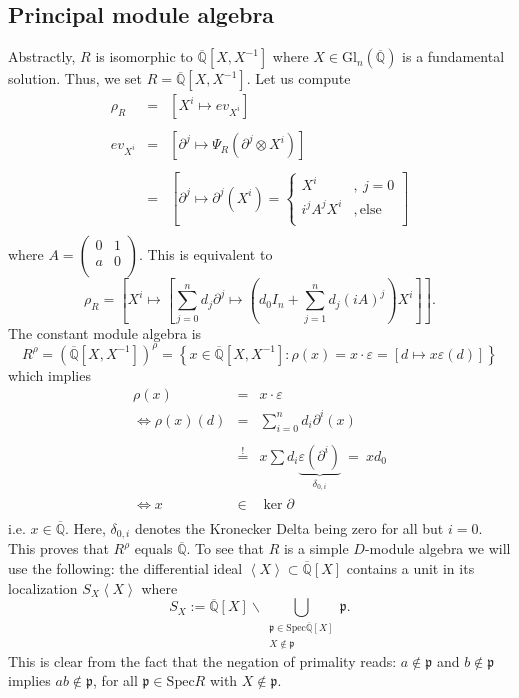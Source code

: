 \documentclass[10pt,a4paper]{article}
\newcommand{\eps}{\varepsilon}
\newcommand{\qz}{{\mathbb{Q}}}
\newcommand{\qzcl}{\overline{\qz}}
\newcommand{\bao}[1]{\begin{array}{#1}}
\newcommand{\ea}{\end{array}}
\begin{document}
\subsection{Principal module algebra}
Abstractly, $R$ is isomorphic to $\qzcl\left[X,X^{-1}\right]$ where $X \in \mathrm{Gl}_n(\qzcl)$ is a fundamental solution. Thus, we set $R = \qzcl[X,X^{-1}]$. Let us compute
$$\bao{rcl}
\rho_R &=& \left[X^i \longmapsto ev_{X^i}\right]\\
&&\\
ev_{X^i} &=& \left[\partial^j \longmapsto \Psi_R(\partial^j \otimes X^i)\right]\\
&&\\
&=& \left[\partial^j \longmapsto \partial^j(X^i) = \begin{cases}
X^i&,\ j = 0\\
i^j A^j X^i&, \mathrm{else}\\
\end{cases}\right]\\
\ea$$
where $A = \left(\bao{cc}0 & 1\\a & 0\\\ea\right)$. This is equivalent to
$$\rho_R = \left[X^i \longmapsto \left[\sum_{j=0}^n d_j \partial^j \longmapsto \left(d_0 I_n + \sum_{j=1}^n d_j (i A)^j\right) X^i\right]\right].$$
The constant module algebra is
$$R^{\rho} = \left(\qzcl\left[X,X^{-1}\right]\right)^\rho = \left\{x \in \qzcl\left[X,X^{-1}\right] : \rho(x) = x \cdot \eps = \left[d \longmapsto x \eps(d)\right]\right\}$$
which implies
$$\bao{rcl}
\rho(x) &=& x \cdot \eps\\
\Leftrightarrow \rho(x)(d) &=& \sum_{i=0}^n d_i \partial^i(x)\\
&&\\
&\stackrel{!}{=}& x \sum d_i \underbrace{\eps(\partial^i)}_{\delta_{0,i}}\ =\ x d_0\\
\Leftrightarrow x &\in& \ker \partial\\
\ea$$
i.e. $x \in \qzcl$. Here, $\delta_{0,i}$ denotes the Kronecker Delta being zero for all but $i = 0$. This proves that $R^\rho$ equals $\qzcl$. To see that $R$ is a simple $D$-module algebra we will use the following: the differential ideal $\left<X\right> \subset \qzcl[X]$ contains a unit in its localization $S_{X} \left<X\right>$ where
$$S_{X} := \qzcl[X]\backslash\bigcup_{\substack{\mathfrak{p} \in \mathrm{Spec}\qzcl[X]\\X \notin \mathfrak{p}}} \mathfrak{p}.$$
This is clear from the fact that the negation of primality reads: $a \notin \mathfrak{p}$ and $b \notin \mathfrak{p}$ implies $a b \notin \mathfrak{p}$, for all $\mathfrak{p} \in \mathrm{Spec}R$ with $X \notin \mathfrak{p}$.
\end{document}
